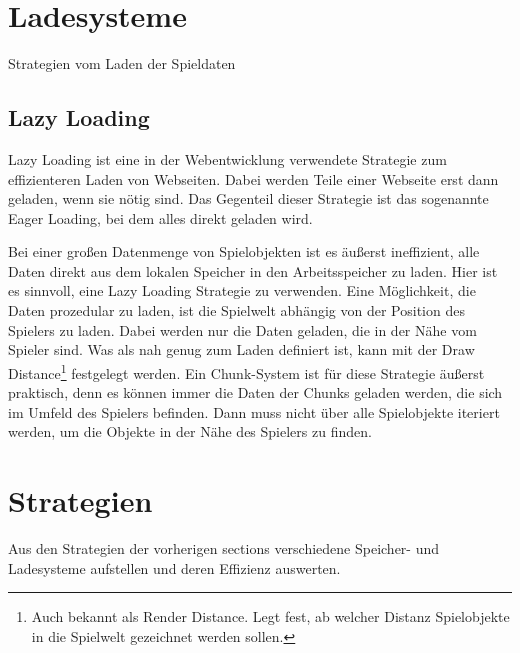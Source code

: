 \section{Ladesysteme}\label{sect:ladesysteme}
Strategien vom Laden der Spieldaten


\subsection{Lazy Loading} \label{ssect:lazyloading}
Lazy Loading ist eine in der Webentwicklung verwendete Strategie zum effizienteren Laden von Webseiten. Dabei werden Teile einer Webseite erst dann geladen, wenn sie nötig sind. Das Gegenteil dieser Strategie ist das sogenannte Eager Loading, bei dem alles direkt geladen wird.\cite{cloudflareLazyLoad}

Bei einer großen Datenmenge von Spielobjekten ist es äußerst ineffizient, alle Daten direkt aus dem lokalen Speicher in den Arbeitsspeicher zu laden. Hier ist es sinnvoll, eine Lazy Loading Strategie zu verwenden. Eine Möglichkeit, die Daten prozedular zu laden, ist die Spielwelt abhängig von der Position des Spielers zu laden. Dabei werden nur die Daten geladen, die in der Nähe vom Spieler sind. Was als nah genug zum Laden definiert ist, kann mit der Draw Distance\footnote{Auch bekannt als Render Distance. Legt fest, ab welcher Distanz Spielobjekte in die Spielwelt gezeichnet werden sollen.\cite{nerdburglarsWhatDraw}} festgelegt werden. Ein Chunk-System ist für diese Strategie äußerst praktisch, denn es können immer die Daten der Chunks geladen werden, die sich im Umfeld des Spielers befinden. Dann muss nicht über alle Spielobjekte iteriert werden, um die Objekte in der Nähe des Spielers zu finden.




\section{Strategien}
Aus den Strategien der vorherigen sections verschiedene Speicher- und Ladesysteme aufstellen und deren Effizienz auswerten. 

